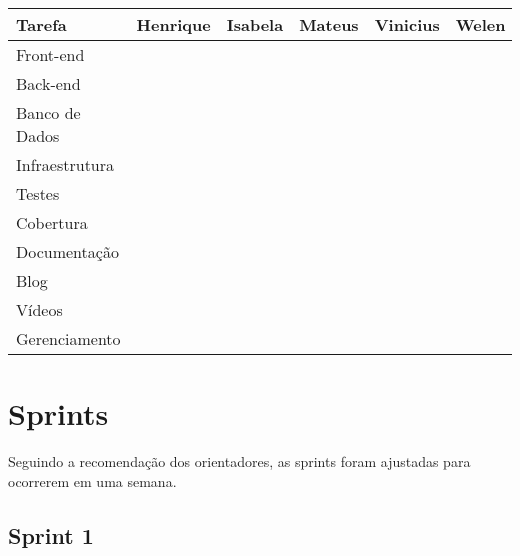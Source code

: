 		\begin{table}[]
			\begin{tabular}{|l|l|l|l|l|l|}
				\hline
				Tarefa         & Henrique & Isabela & Mateus & Vinicius & Welen \\ \hline
				Front-end      &          &         &        &          &       \\ \hline
				Back-end       &          &         &        &          &       \\ \hline
				Banco de Dados &          &         &        &          &       \\ \hline
				Infraestrutura &          &         &        &          &       \\ \hline
				Testes         &          &         &        &          &       \\ \hline
				Cobertura      &          &         &        &          &       \\ \hline
				Documentação   &          &         &        &          &       \\ \hline
				Blog           &          &         &        &          &       \\ \hline
				Vídeos         &          &         &        &          &       \\ \hline
				Gerenciamento  &          &         &        &          &       \\ \hline
			\end{tabular}
			\end{table}

	\section{Sprints}

		Seguindo a recomendação dos orientadores, as sprints foram ajustadas para ocorrerem em uma semana.

	\subsection{Sprint 1}